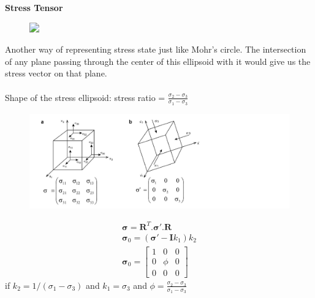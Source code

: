 \documentclass[11pt]{beamer}
\begin{document}
\begin{frame}{\textbf{Stress Tensor}}
    \begin{figure}
        \includegraphics<1->[width=0.7\linewidth]{images/stressellipse}
    \end{figure}

    \pause%
    
    Another way of representing stress state just like Mohr's circle. The intersection of any plane passing through the center of this ellipsoid with it would give us the stress vector on that plane.
    \\~\\
    Shape of the stress ellipsoid: stress ratio = $\frac{\sigma_2 - \sigma_3}{\sigma_1 - \sigma_3}$
\end{frame}

\begin{frame}
    \begin{figure}[!htb]
        \centering
        \includegraphics[width=1\linewidth]{images/obliquestress}
    \end{figure}
    \pause%
    \begin{align*}
        \mathbf{\sigma} = \mathbf{R}^T.\mathbf{\sigma'}.\mathbf{R} \\
        \mathbf{\sigma}_0 = (\mathbf{\sigma'} - \mathbf{I}k_1)k_2 \\
        \mathbf{\sigma}_0 = 
        \begin{bmatrix}
            1 & 0 & 0 \\
            0 & \phi & 0 \\
            0 & 0 & 0
        \end{bmatrix}
    \end{align*}
    if $k_2 = 1/(\sigma_1 - \sigma_3)$ and $k_1 = \sigma_3$ and $\phi = \frac{\sigma_2 - \sigma_3}{\sigma_1 - \sigma_3}$

\end{frame}
\end{document}
